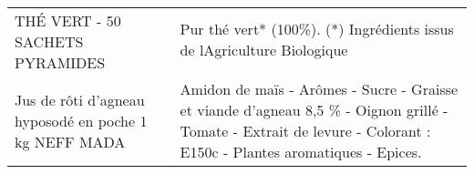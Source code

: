 \begin{longtable}{p{5cm}p{10cm}}
                                                                          THÉ VERT - 50 SACHETS PYRAMIDES &                                                                                                                                                                                                                                                                                                                                                                                                                                                                                                                                                                                                                                                                                                                                                                                                                                                                                                                                                                 Pur thé vert* (100\%).  (*) Ingrédients issus de lAgriculture Biologique \\
                                                    Jus de rôti d'agneau hyposodé en poche 1 kg NEFF MADA &                                                                                                                                                                                                                                                                                                                                                                                                                                                                                                                                                                                                                                                                                                                                                                                                                                                                       Amidon de maïs - Arômes - Sucre - Graisse et viande d'agneau 8,5 \% - Oignon grillé - Tomate - Extrait de levure - Colorant : E150c - Plantes aromatiques - Epices. \\

\end{longtable}
